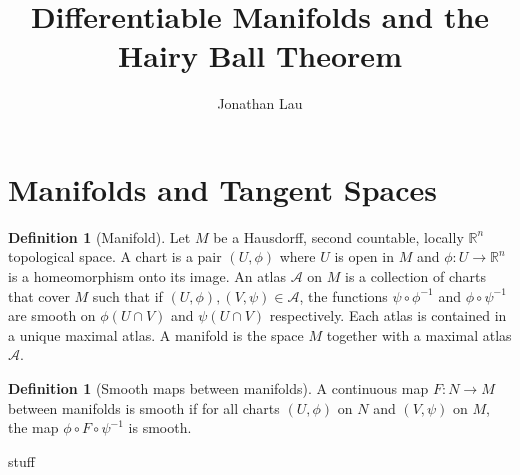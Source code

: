 \documentclass[]{article}
\theoremstyle{definition}
\theoremstyle{definition}
\newtheorem{definition}[theorem]{Definition} %
\begin{document}
\title{Differentiable Manifolds and the Hairy Ball Theorem}
\author{Jonathan Lau}
\maketitle

\section{Manifolds and Tangent Spaces}

\begin{definition}[Manifold]
    Let $M$ be a Hausdorff, second countable, locally $\mathbb{R}^n$ topological space. A chart is a pair $(U, \phi)$ where $U$ is open in $M$ and $\phi:U\rightarrow \mathbb{R}^n$ is a homeomorphism onto its image. An atlas $\mathcal{A}$ on $M$ is a collection of charts that cover $M$ such that if $(U,\phi),(V,\psi)\in \mathcal{A}$, the functions $\psi\circ\phi^{-1}$ and $\phi\circ\psi^{-1}$ are smooth on $\phi(U\cap V)$ and $\psi(U\cap V)$ respectively. Each atlas is contained in a unique maximal atlas. A manifold is the space $M$ together with a maximal atlas $\mathcal{A}$.
\end{definition}

\begin{definition}[Smooth maps between manifolds]
    A continuous map $F:N\rightarrow M$ between manifolds is smooth if for all charts $(U, \phi)$ on $N$ and $(V, \psi)$ on $M$, the map $\phi\circ F\circ\psi^{-1}$ is smooth.
\end{definition}

stuff
\end{document}
